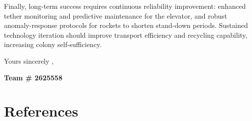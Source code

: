 \documentclass{mcmthesis}
\begin{document}
\indent Finally, long-term success requires continuous reliability improvement: enhanced tether monitoring and predictive maintenance for the elevator, and robust anomaly-response protocols for rockets to shorten stand-down periods. Sustained technology iteration should improve transport efficiency and recycling capability, increasing colony self-sufficiency.

\vspace{1.5cm}

\hfill Yours sincerely ,

\hfill {\bf Team \# 2625558}

\section{References}
\printbibliography[heading=none]

\AImatter
\end{document}
